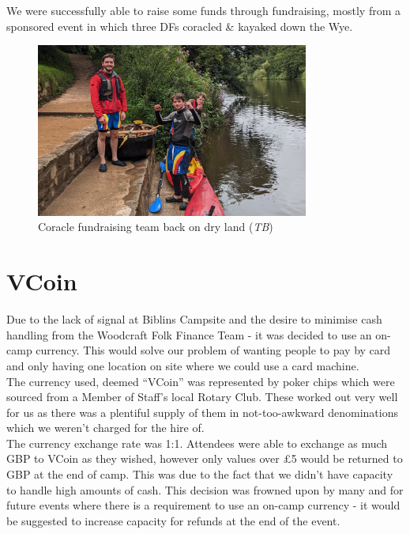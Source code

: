 We were successfully able to raise some funds through fundraising, mostly from a sponsored event in which three DFs coracled \& kayaked down the Wye. 
\begin{figure}[ht]
    \centering
    \includegraphics[width=0.8\textwidth]{assets/coracle-team.jpg}
    \caption{Coracle fundraising team back on dry land (\textit{TB})}
\end{figure}

\section{VCoin}
Due to the lack of signal at Biblins Campsite and the desire to minimise cash handling from the Woodcraft Folk Finance Team - it was decided to use an on-camp currency. This would solve our problem of wanting people to pay by card and only having one location on site where we could use a card machine.\\

The currency used, deemed ``VCoin'' was represented by poker chips which were sourced from a Member of Staff's local Rotary Club. These worked out very well for us as there was a plentiful supply of them in not-too-awkward denominations which we weren't charged for the hire of.\\

The currency exchange rate was 1:1. Attendees were able to exchange as much GBP to VCoin as they wished, however only values over \pounds5 would be returned to GBP at the end of camp. This was due to the fact that we didn't have capacity to handle high amounts of cash. This decision was frowned upon by many and for future events where there is a requirement to use an on-camp currency - it would be suggested to increase capacity for refunds at the end of the event.\\

